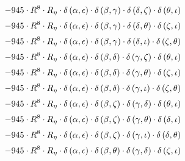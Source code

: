 \begin{subequations}
\begin{gather}
 \\[0.2em] \notag 		 - 945 \cdot R^{8} \cdot R_{\eta{}} \cdot \delta{}\left(\alpha{}, \epsilon{}\right) \cdot \delta{}\left(\beta{}, \gamma{}\right) \cdot \delta{}\left(\delta{}, \zeta{}\right) \cdot \delta{}\left(\theta{}, \iota{}\right) 
 \\[0.2em] \notag 		 - 945 \cdot R^{8} \cdot R_{\eta{}} \cdot \delta{}\left(\alpha{}, \epsilon{}\right) \cdot \delta{}\left(\beta{}, \gamma{}\right) \cdot \delta{}\left(\delta{}, \theta{}\right) \cdot \delta{}\left(\zeta{}, \iota{}\right) 
 \\[0.2em] \notag 		 - 945 \cdot R^{8} \cdot R_{\eta{}} \cdot \delta{}\left(\alpha{}, \epsilon{}\right) \cdot \delta{}\left(\beta{}, \gamma{}\right) \cdot \delta{}\left(\delta{}, \iota{}\right) \cdot \delta{}\left(\zeta{}, \theta{}\right) 
 \\[0.2em] \notag 		 - 945 \cdot R^{8} \cdot R_{\eta{}} \cdot \delta{}\left(\alpha{}, \epsilon{}\right) \cdot \delta{}\left(\beta{}, \delta{}\right) \cdot \delta{}\left(\gamma{}, \zeta{}\right) \cdot \delta{}\left(\theta{}, \iota{}\right) 
 \\[0.2em] \notag 		 - 945 \cdot R^{8} \cdot R_{\eta{}} \cdot \delta{}\left(\alpha{}, \epsilon{}\right) \cdot \delta{}\left(\beta{}, \delta{}\right) \cdot \delta{}\left(\gamma{}, \theta{}\right) \cdot \delta{}\left(\zeta{}, \iota{}\right) 
 \\[0.2em] \notag 		 - 945 \cdot R^{8} \cdot R_{\eta{}} \cdot \delta{}\left(\alpha{}, \epsilon{}\right) \cdot \delta{}\left(\beta{}, \delta{}\right) \cdot \delta{}\left(\gamma{}, \iota{}\right) \cdot \delta{}\left(\zeta{}, \theta{}\right) 
 \\[0.2em] \notag 		 - 945 \cdot R^{8} \cdot R_{\eta{}} \cdot \delta{}\left(\alpha{}, \epsilon{}\right) \cdot \delta{}\left(\beta{}, \zeta{}\right) \cdot \delta{}\left(\gamma{}, \delta{}\right) \cdot \delta{}\left(\theta{}, \iota{}\right) 
 \\[0.2em] \notag 		 - 945 \cdot R^{8} \cdot R_{\eta{}} \cdot \delta{}\left(\alpha{}, \epsilon{}\right) \cdot \delta{}\left(\beta{}, \zeta{}\right) \cdot \delta{}\left(\gamma{}, \theta{}\right) \cdot \delta{}\left(\delta{}, \iota{}\right) 
 \\[0.2em] \notag 		 - 945 \cdot R^{8} \cdot R_{\eta{}} \cdot \delta{}\left(\alpha{}, \epsilon{}\right) \cdot \delta{}\left(\beta{}, \zeta{}\right) \cdot \delta{}\left(\gamma{}, \iota{}\right) \cdot \delta{}\left(\delta{}, \theta{}\right) 
 \\[0.2em] \notag 		 - 945 \cdot R^{8} \cdot R_{\eta{}} \cdot \delta{}\left(\alpha{}, \epsilon{}\right) \cdot \delta{}\left(\beta{}, \theta{}\right) \cdot \delta{}\left(\gamma{}, \delta{}\right) \cdot \delta{}\left(\zeta{}, \iota{}\right) 

\end{gather}
\end{subequations}
